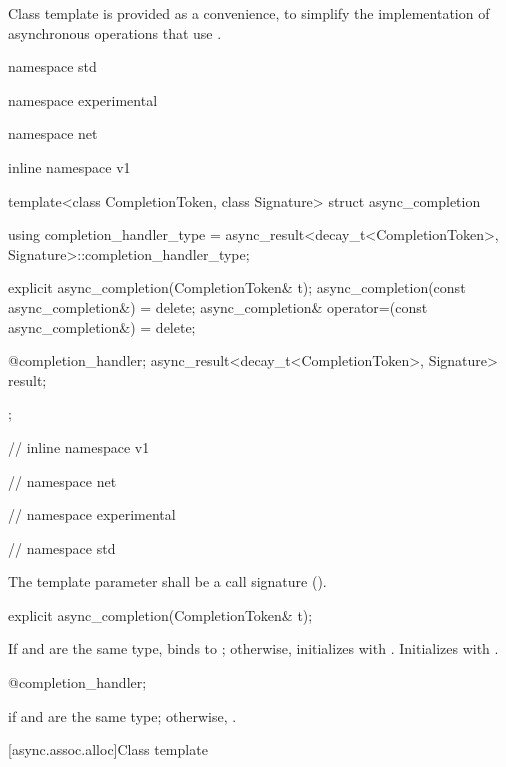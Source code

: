 %
\pnum
Class template  is provided as a convenience, to simplify the implementation of asynchronous operations that use .

\begin{codeblock}
namespace std {
namespace experimental {
namespace net {
inline namespace v1 {

  template<class CompletionToken, class Signature>
  struct async_completion
  {
    using completion_handler_type = async_result<decay_t<CompletionToken>,
      Signature>::completion_handler_type;

    explicit async_completion(CompletionToken& t);
    async_completion(const async_completion&) = delete;
    async_completion& operator=(const async_completion&) = delete;

    @\seebelow@ completion_handler;
    async_result<decay_t<CompletionToken>, Signature> result;
  };

} // inline namespace v1
} // namespace net
} // namespace experimental
} // namespace std
\end{codeblock}

\pnum
The template parameter  shall be a call signature ().

\begin{itemdecl}
explicit async_completion(CompletionToken& t);
\end{itemdecl}

\begin{itemdescr}
\pnum
\effects If  and  are the same type,
binds  to ;
otherwise, initializes  with .
Initializes  with .
\end{itemdescr}

\begin{itemdecl}
@\seebelow@ completion_handler;
\end{itemdecl}

\begin{itemdescr}
\pnum
\ctype {} if  and  are the same type; otherwise, .
\end{itemdescr}



[async.assoc.alloc]{Class template }

